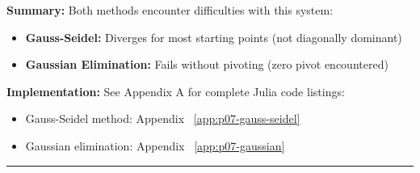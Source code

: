 \textbf{Summary:} Both methods encounter difficulties with this system:
\begin{itemize}
\item \textbf{Gauss-Seidel:} Diverges for most starting points (not diagonally dominant)
\item \textbf{Gaussian Elimination:} Fails without pivoting (zero pivot encountered)
\end{itemize}

\textbf{Implementation:} See Appendix A for complete Julia code listings:
\begin{itemize}
\item Gauss-Seidel method: Appendix ~\ref{app:p07-gauss-seidel}
\item Gaussian elimination: Appendix ~\ref{app:p07-gaussian}
\end{itemize}

\vspace{2em}
\noindent\rule{\textwidth}{0.4pt}
